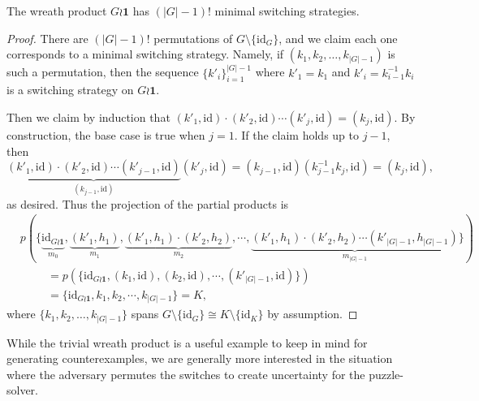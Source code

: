\begin{proposition}
  The wreath product $G \wr \mathbf{1}$ has $(|G|-1)!$ minimal switching
  strategies.
  \label{prop:countingTrivialSS}
\end{proposition}
\begin{proof}
  There are $(|G| - 1)!$ permutations of $G \setminus \{\mathrm{id}_G\}$, and
  we claim each one corresponds to a minimal switching strategy. Namely,
  if $(k_1, k_2, \dots, k_{|G|-1})$ is such a permutation, then
  the sequence $\{k'_i\}_{i=1}^{|G|-1}$ where $k'_1 = k_1$ and
  $k'_i = k_{i-1}^{-1}k_i$ is a switching strategy on $G \wr \mathbf{1}$.

  Then we claim by induction that
  $(k'_1, \mathrm{id})\cdot(k'_2, \mathrm{id})\cdots(k'_j, \mathrm{id}) = (k_j, \mathrm{id})$.
  By construction, the base case is true when $j = 1$. If the claim holds up to
  $j-1$, then \begin{equation}
    \underbrace{
      (k'_1, \mathrm{id})\cdot(k'_2, \mathrm{id})\cdots(k'_{j-1}, \mathrm{id})
    }_{(k_{j-1}, \mathrm{id})}
    (k'_j, \mathrm{id})
    = (k_{j-1}, \mathrm{id})(k_{j-1}^{-1}k_j, \mathrm{id})
    = (k_j, \mathrm{id}),
  \end{equation} as desired.
  Thus the projection of the partial products is
  \begin{align}
    &p(\{
      \underbrace{\mathrm{id}_{G \wr \mathbf{1}}}_{m_0},
      \underbrace{(k'_1, h_1)}_{m_1},
      \underbrace{(k'_1, h_1)\cdot(k'_2, h_2)}_{m_2},
      \cdots,
      \underbrace{(k'_1, h_1)\cdot(k'_2, h_2)\cdots(k'_{|G|-1}, h_{|G|-1})}_{m_{|G|-1}}
    \}) \\
    & \hspace{1cm} =
    p(\{
      \mathrm{id}_{G \wr \mathbf{1}},
      (k_1, \mathrm{id}),
      (k_2, \mathrm{id}),
      \cdots,
      (k'_{|G|-1}, \mathrm{id})
    \}) \\
    & \hspace{1cm} = \{\mathrm{id}_{G \wr \mathbf{1}}, k_1, k_2, \cdots,k_{|G|-1}\} = K,
  \end{align}
  where $\{k_1, k_2, \dots, k_{|G|-1}\}$ spans
  $G \setminus \{\mathrm{id}_G\} \cong K \setminus \{\mathrm{id}_K\}$ by
  assumption.
\end{proof}

While the trivial wreath product is a useful example to keep in mind for
generating counterexamples, we are generally more interested in the situation
where the adversary permutes the switches to create uncertainty for the
puzzle-solver.

